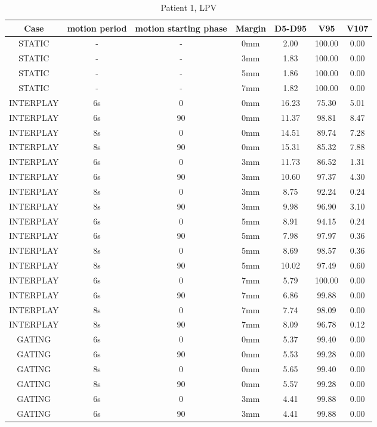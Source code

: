 \begin{table}[H]
  \centering
  \caption{Patient 1, LPV}
  \begin{tabular}{|c||c|c|c||c|c|c|}
    \hline\hline
    Case & motion period & motion starting phase & Margin & D5-D95 & V95 & V107\\
    \hline 
STATIC & - & - & 0mm & 2.00 & 100.00 & 0.00 \\
STATIC & - & - & 3mm & 1.83 & 100.00 & 0.00 \\
STATIC & - & - & 5mm & 1.86 & 100.00 & 0.00 \\
STATIC & - & - & 7mm & 1.82 & 100.00 & 0.00 \\
INTERPLAY & 6s & 0 & 0mm & 16.23 & 75.30 & 5.01 \\
INTERPLAY & 6s & 90 & 0mm & 11.37 & 98.81 & 8.47 \\
INTERPLAY & 8s & 0 & 0mm & 14.51 & 89.74 & 7.28 \\
INTERPLAY & 8s & 90 & 0mm & 15.31 & 85.32 & 7.88 \\
INTERPLAY & 6s & 0 & 3mm & 11.73 & 86.52 & 1.31 \\
INTERPLAY & 6s & 90 & 3mm & 10.60 & 97.37 & 4.30 \\
INTERPLAY & 8s & 0 & 3mm & 8.75 & 92.24 & 0.24 \\
INTERPLAY & 8s & 90 & 3mm & 9.98 & 96.90 & 3.10 \\
INTERPLAY & 6s & 0 & 5mm & 8.91 & 94.15 & 0.24 \\
INTERPLAY & 6s & 90 & 5mm & 7.98 & 97.97 & 0.36 \\
INTERPLAY & 8s & 0 & 5mm & 8.69 & 98.57 & 0.36 \\
INTERPLAY & 8s & 90 & 5mm & 10.02 & 97.49 & 0.60 \\
INTERPLAY & 6s & 0 & 7mm & 5.79 & 100.00 & 0.00 \\
INTERPLAY & 6s & 90 & 7mm & 6.86 & 99.88 & 0.00 \\
INTERPLAY & 8s & 0 & 7mm & 7.74 & 98.09 & 0.00 \\
INTERPLAY & 8s & 90 & 7mm & 8.09 & 96.78 & 0.12 \\
GATING & 6s & 0 & 0mm & 5.37 & 99.40 & 0.00 \\
GATING & 6s & 90 & 0mm & 5.53 & 99.28 & 0.00 \\
GATING & 8s & 0 & 0mm & 5.65 & 99.40 & 0.00 \\
GATING & 8s & 90 & 0mm & 5.57 & 99.28 & 0.00 \\
GATING & 6s & 0 & 3mm & 4.41 & 99.88 & 0.00 \\
GATING & 6s & 90 & 3mm & 4.41 & 99.88 & 0.00 \\

\end{tabular}
\end{table}
